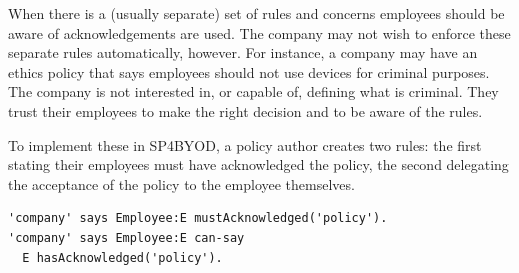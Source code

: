 \documentclass{llncs}
\newcommand{\AppPAL}[0]{SP4BYOD}
\begin{document}
When there is a (usually separate) set of rules and concerns employees should be aware of acknowledgements are used.
The company may not wish to enforce these separate rules automatically, however.
For instance, a company may have an ethics policy that says employees should not use devices for criminal purposes.
The company is not interested in, or capable of, defining what is criminal.
They trust their employees to make the right decision and to be aware of the rules.

To implement these in \AppPAL, a policy author creates two rules: 
  the first stating their employees must have acknowledged the policy,
  the second delegating the acceptance of the policy to the employee themselves.
\begin{lstlisting}
'company' says Employee:E mustAcknowledged('policy').
'company' says Employee:E can-say
  E hasAcknowledged('policy').
\end{lstlisting}


\end{document}
